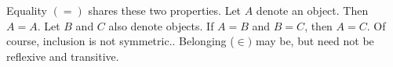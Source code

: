 

Equality $(=)$ shares these two properties.
Let $A$ denote an object.
Then $A = A$.
Let $B$ and $C$ also denote objects.
If $A = B$ and $B = C$, then $A = C$.
Of course, inclusion is not symmetric..
Belonging ($\in)$ may be, but need not be reflexive and transitive.


